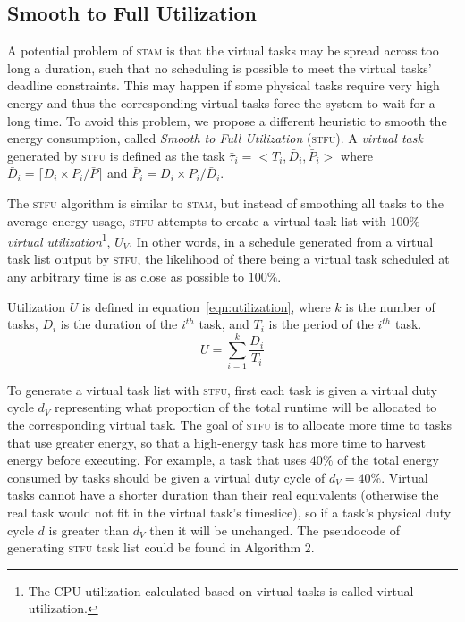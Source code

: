 \subsection{Smooth to Full Utilization}

A potential problem of \textsc{stam} is that the virtual tasks may be spread across too long a duration, such that no scheduling is possible to meet the virtual tasks' deadline constraints. This may happen if some physical tasks require very high energy and thus the corresponding virtual tasks force the system to wait for a long time. To avoid this problem, we propose a different heuristic to smooth the energy consumption, called \emph{Smooth to Full Utilization} (\textsc{stfu}).  A \emph{virtual task} generated by \textsc{stfu} is defined as the task $\bar{\tau}_i = <T_i, \bar{D}_i, \bar{P}_i>$ where $\bar{D}_i = \lceil D_i \times  P_i / \bar{P} \rceil$ and $\bar{P}_i = D_i \times  P_i / \bar{D}_i$.

The \textsc{stfu} algorithm is similar to \textsc{stam}, but instead of smoothing all tasks to the average energy usage, \textsc{stfu} attempts to create a virtual task list with $100\%$ \emph{virtual utilization}\footnote{The CPU utilization calculated based on virtual tasks is called virtual utilization.}, $U_V$.  In other words, in a schedule generated from a virtual task list output by \textsc{stfu}, the likelihood of there being a virtual task scheduled at any arbitrary time is as close as possible to $100\%$.

Utilization $U$ is defined in equation~\ref{eqn:utilization}, where $k$ is the number of tasks, $D_i$ is the duration of the $i^{th}$ task, and $T_i$ is the period of the $i^{th}$ task.
\begin{equation}
\label{eqn:utilization}
U = \sum_{i=1}^{k} \frac{D_i}{T_i}
\end{equation}

To generate a virtual task list with \textsc{stfu}, first each task is given a virtual duty cycle $d_V$ representing what proportion of the total runtime will be allocated to the corresponding virtual task.  The goal of \textsc{stfu} is to allocate more time to tasks that use greater energy, so that a high-energy task has more time to harvest energy before executing.  For example, a task that uses $40\%$ of the total energy consumed by tasks should be given a virtual duty cycle of $d_V=40\%$.  Virtual tasks cannot have a shorter duration than their real equivalents (otherwise the real task would not fit in the virtual task's timeslice), so if a task's physical duty cycle $d$ is greater than $d_V$ then it will be unchanged. The pseudocode of generating \textsc{stfu} task list could be found in Algorithm 2.

